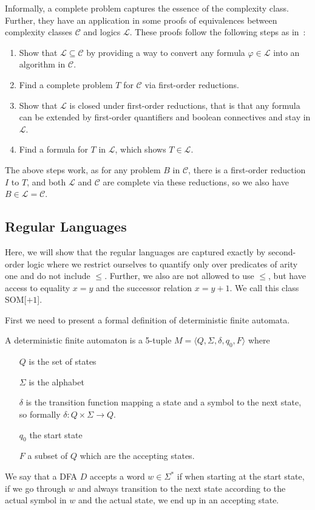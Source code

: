 Informally, a complete problem captures the essence of the complexity class.
Further, they have an application in some proofs of equivalences between complexity classes $\mathcal{C}$ and logics $\mathcal{L}$.
These proofs follow the following steps as in~\cite{descriptive-complexity}:
\begin{enumerate}
    \item Show that $\mathcal{L} \subseteq \mathcal{C}$ by providing a way to convert any formula $\varphi \in \mathcal{L}$ into an algorithm in $\mathcal{C}$.
    \item Find a complete problem $T$ for $\mathcal{C}$ via first-order reductions.
    \item Show that $\mathcal{L}$ is closed under first-order reductions, that is that any formula can be extended by first-order quantifiers and boolean connectives and stay in $\mathcal{L}$.
    \item Find a formula for $T$ in $\mathcal{L}$, which shows $T \in \mathcal{L}$.
\end{enumerate}
The above steps work, as for any problem $B$ in $\mathcal{C}$, there is a first-order reduction $I$ to $T$, and both $\mathcal{L}$ and $\mathcal{C}$ are complete via these reductions, so we also have $B \in \mathcal{L} = \mathcal{C}$.

\subsection{Regular Languages}\label{subsec:des-regular-languages}

Here, we will show that the regular languages are captured exactly by second-order logic where we restrict ourselves to quantify only over predicates of arity one and do not include $\leq$.
Further, we also are not allowed to use $\leq$, but have access to equality $x = y$ and the successor relation $x = y + 1$.
We call this class SOM[$+1$].

First we need to present a formal definition of deterministic finite automata.
\begin{define}[DFA]
    A deterministic finite automaton is a 5-tuple $M = \langle Q, \Sigma, \delta, q_0,  F \rangle$ where
    \begin{itemize}
        \setlength\itemsep{0.2em}
        \item[$Q$] is the set of states
        \item[$\Sigma$] is the alphabet
        \item[$\delta$] is the transition function mapping a state and a symbol to the next state, so formally $\delta : Q\times \Sigma \to Q$.
        \item[$q_0$] the start state
        \item[$F$] a subset of $Q$ which are the accepting states.
    \end{itemize}
\end{define}
We say that a DFA $D$ accepts a word $w \in \Sigma^{*}$ if when starting at the start state, if we go through $w$ and always transition to the next state according to the actual symbol in $w$ and the actual state, we end up in an accepting state.

